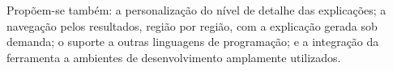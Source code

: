 \documentclass[
    12pt,                   %
    openright,              %
    oneside,                %
    a4paper,                %
    sumario=tradicional,    %
    english,                %
    brazil,                 %
    ]{abntex2}
\begin{document}
Propõem-se também: a personalização do nível de detalhe das explicações; a navegação pelos resultados, região por região, com a explicação gerada sob demanda; o suporte a outras linguagens de programação; e a integração da ferramenta a ambientes de desenvolvimento amplamente utilizados.


%
%
\end{document}
